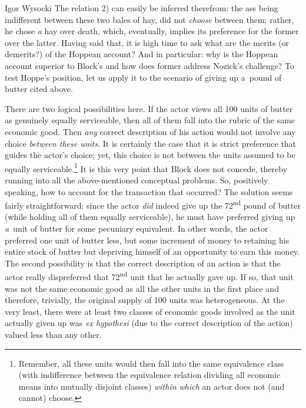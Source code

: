 \begin{artengenv}{Igor Wysocki}
The relation 2) can easily be inferred therefrom: the ass being indifferent between these two bales of hay, did not \textit{choose} between them; rather, he chose \textit{a} hay over death, which, eventually, implies its preference for the former over the latter. Having said that, it is high time to ask what are the merits (or demerits?) of the Hoppean account? And in particular: why is the Hoppean account superior to Block's and how does former address Nozick's challenge? To test Hoppe's position, let us apply it to the scenario of giving up a~pound of butter cited above.

There are two logical possibilities here. If the actor views all 100 units of butter as genuinely equally serviceable, then all of them fall into the rubric of the same economic good. Then \textit{any} correct description of his action would not involve any choice \textit{between these units}. It is certainly the case that it is strict preference that guides the actor's choice; yet, this choice is not between the units assumed to be equally serviceable.\footnote{Remember, all these units would then fall into the same equivalence class (with indifference between the equivalence relation dividing all economic means into mutually disjoint classes) \textit{within which} an actor does not (and cannot) choose.} It is this very point that Block does not concede, thereby running into all the above-mentioned conceptual problems. So, positively speaking, how to account for the transaction that occurred? The solution seems fairly straightforward: since the actor \textit{did} indeed give up the 72\textsuperscript{nd} pound of butter (while holding all of them equally serviceable), he must have preferred giving up \textit{a}~unit of butter for some pecuniary equivalent. In other words, the actor preferred one unit of butter less, but some increment of money to retaining his entire stock of butter but depriving himself of an opportunity to earn this money. The second possibility is that the correct description of an action is that the actor really dispreferred that 72\textsuperscript{nd} unit that he actually gave up. If so, that unit was not the same economic good as all the other units in the first place and therefore, trivially, the original supply of 100 units was heterogeneous. At the very least, there were at least two classes of economic goods involved as the unit actually given up was \textit{ex hypothesi} (due to the correct description of the action) valued less than any other.


\end{artengenv}
